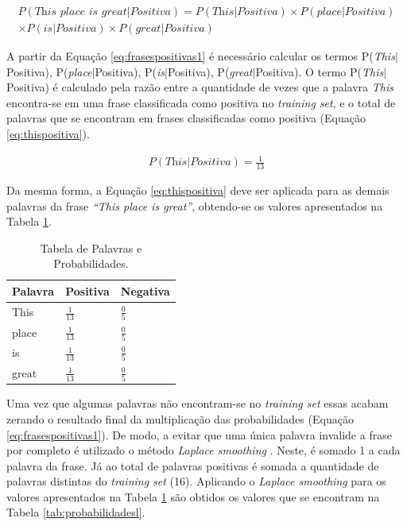 \begin{equation}
\begin{gathered}
P(\textit{This place is great}|Positiva) = P(\textit{This}|Positiva)
\times P(\textit{place}|Positiva) \\ \times P(\textit{is}|Positiva) \times
P(\textit{great}|Positiva)
\label{eq:frasespositivas1}
\end{gathered}
\end{equation}

A partir da Equação \ref{eq:frasespositivas1} é necessário calcular os
termos P(\textit{This}$\vert$Positiva),
P(\textit{place}$\vert$Positiva), P(\textit{is}$\vert$Positiva), P(\textit{great}$\vert$Positiva).
O termo P(\textit{This}$\vert$Positiva) é calculado pela razão entre a
quantidade de vezes que a palavra \textit{This} encontra-se em uma frase
classificada como positiva no \textit{training set}, e o total de palavras que
se encontram em frases classificadas como positiva (Equação
\ref{eq:thispositiva}).

\begin{equation}
\begin{gathered}
P(\textit{This}|Positiva) = \frac{1}{13}
\label{eq:thispositiva}
\end{gathered}
\end{equation}


Da mesma forma, a Equação \ref{eq:thispositiva} deve ser aplicada para as demais
palavras da frase \textit{``This place is great''}, obtendo-se os valores
apresentados na Tabela \ref{tab:probabilidadesnb}.

\begin{table}[htb]
\centering
\renewcommand{\arraystretch}{1.5}%
\begin{tabular}{lll}
\hline

Palavra & Positiva & Negativa \\ \hline
This & \large $\frac{1}{13}$ & \large $\frac{0}{5}$ \\
place & \large $\frac{1}{13}$ & \large $\frac{0}{5}$ \\
is & \large $\frac{1}{13}$ & \large $\frac{0}{5}$ \\
great & \large $\frac{1}{13}$ & \large $\frac{0}{5}$ \\
\end{tabular}
\caption{Tabela de Palavras e Probabilidades.}
\label{tab:probabilidadesnb}
\end{table}

Uma vez que algumas palavras não encontram-se no \textit{training set}
essas acabam zerando o resultado final da
multiplicação das probabilidades (Equação
\ref{eq:frasespositivas1}). De modo, a evitar que uma única palavra
invalide a frase por completo é utilizado o método \textit{Laplace smoothing}
\cite{Manning:2008:IIR:1394399}. Neste, é somado 1 a cada palavra da frase. Já
ao total de palavras positivas é somada a quantidade de palavras distintas do
\textit{training set} (16). Aplicando o \textit{Laplace smoothing} para os
valores apresentados na Tabela \ref{tab:probabilidadesnb} são obtidos os valores
que se encontram na Tabela \ref{tab:probabilidadesl}.


